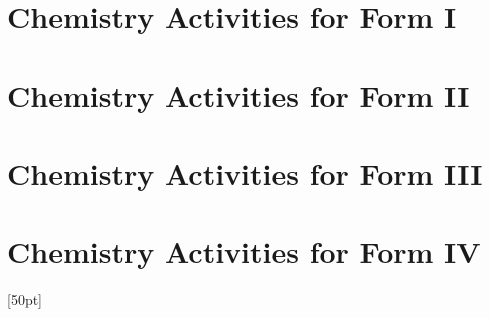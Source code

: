 \documentclass[10pt,a4paper]{report}
\begin{document}

%
%

\tableofcontents




\chapter{Chemistry Activities for Form I}
%

\chapter{Chemistry Activities for Form II}

\chapter{Chemistry Activities for Form III}

\chapter{Chemistry Activities for Form IV}





\appendix

\setcounter{secnumdepth}{2}

\titlespacing*{\chapter}{0pt}{-10pt}{0pt}[50pt]
\titleformat{\chapter}[display]{\normalfont\huge\bfseries}{\chaptertitlename\thechapter}{20pt}{\Huge}




\end{document}
